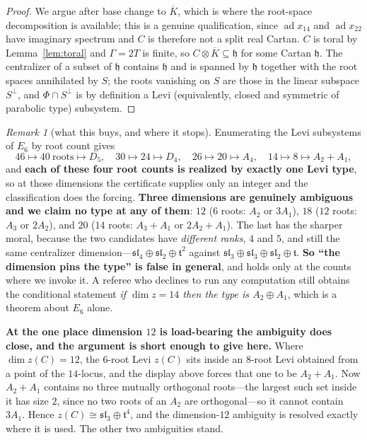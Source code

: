 \documentclass[11pt,reqno]{amsart}
\theoremstyle{plain}
\theoremstyle{definition}
\theoremstyle{remark}
\newtheorem{remark}[theorem]{Remark}
\newcommand{\sll}{\mathfrak{sl}}
\newcommand{\ad}{\operatorname{ad}}
\newcommand{\h}{\mathfrak{h}}
\begin{document}
\begin{proof}
We argue after base change to $\overline K$, which is where the root-space
decomposition is available; this is a genuine qualification, since $\ad x_{14}$ and
$\ad x_{22}$ have imaginary spectrum and $C$ is therefore not a split real Cartan.
$C$ is toral by Lemma~\ref{lem:toral} and $\Gamma=2T$ is finite, so
$C\otimes\overline K\subseteq\h$ for some Cartan $\h$. The centralizer of a subset of $\h$ contains $\h$ and is spanned by
$\h$ together with the root spaces annihilated by $S$; the roots vanishing on $S$ are
those in the linear subspace $S^\perp$, and $\Phi\cap S^\perp$ is by definition a Levi
(equivalently, closed and symmetric of parabolic type) subsystem.
\end{proof}

\begin{remark}[what this buys, and where it stops]\label{rem:leviscope}
Enumerating the Levi subsystems of $E_6$ by root count gives
\[
  46\mapsto 40\ \text{roots}\mapsto D_5,\quad
  30\mapsto 24\mapsto D_4,\quad
  26\mapsto 20\mapsto A_4,\quad
  14\mapsto 8\mapsto A_2{+}A_1 ,
\]
and \textbf{each of these four root counts is realized by exactly one Levi type}, so at
those dimensions the certificate supplies only an integer and the classification does the
forcing. \textbf{Three dimensions are genuinely ambiguous and we claim no type at any of
them}: $12$ ($6$ roots: $A_2$ or $3A_1$), $18$ ($12$ roots: $A_3$ or $2A_2$), and
\textbf{$20$} ($14$ roots: $A_3{+}A_1$ or $2A_2{+}A_1$). The last has the sharper moral,
because the two candidates have \emph{different ranks}, $4$ and $5$, and still the same
centralizer dimension---$\sll_4\oplus\sll_2\oplus\mathfrak t^2$ against
$\sll_3\oplus\sll_3\oplus\sll_2\oplus\mathfrak t$. \textbf{So ``the dimension pins the
type'' is false in general}, and holds only at the counts where we invoke it. A referee
who declines to run any computation still obtains the conditional statement \emph{if
$\dim z=14$ then the type is $A_2\oplus A_1$}, which is a theorem about $E_6$ alone.

\textbf{At the one place dimension $12$ is load-bearing the ambiguity does close, and the
argument is short enough to give here.} Where $\dim z(C)=12$, the $6$-root Levi $z(C)$ sits
inside an $8$-root Levi obtained from a point of the $14$-locus, and the display above forces
that one to be $A_2{+}A_1$. Now $A_2{+}A_1$ contains no three mutually orthogonal roots---the
largest such set inside it has size $2$, since no two roots of an $A_2$ are orthogonal---so it
cannot contain $3A_1$. Hence \textbf{$z(C)\cong\sll_3\oplus\mathfrak t^4$}, and the
dimension-$12$ ambiguity is resolved exactly where it is used. The other two ambiguities stand.
\end{remark}
\end{document}
